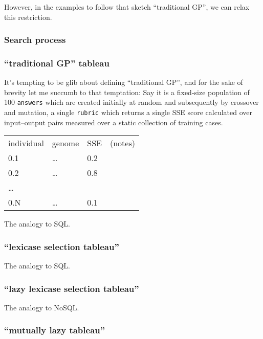 However, in the examples to follow that sketch ``traditional GP'', we can relax this restriction.

\subsubsection{Search process}\hypertarget{search-process}{}\label{search-process}

\subsubsection{``traditional GP'' tableau}\hypertarget{traditional-gp-tableau}{}\label{traditional-gp-tableau}

It's tempting to be glib about defining ``traditional GP'', and for the sake of brevity let me succumb to that temptation: Say it is a fixed-size population of 100 {\tt answers} which are created initially at random and subsequently by crossover and mutation, a single {\tt rubric} which returns a single SSE score calculated over input--output pairs measured over a static collection of training cases.

\begin{longtable}{|l|l|l|l|}
\hline
individual & genome & SSE & (notes)\\
0.1 & \ldots{} & 0.2 & \\
0.2 & \ldots{} & 0.8 & \\
\ldots{} &  &  & \\
0.N & \ldots{} & 0.1 & \\
\hline
\end{longtable}

The analogy to SQL.

\subsubsection{``lexicase selection tableau''}\hypertarget{lexicase-selection-tableau}{}\label{lexicase-selection-tableau}

The analogy to SQL.

\subsubsection{``lazy lexicase selection tableau''}\hypertarget{lazy-lexicase-selection-tableau}{}\label{lazy-lexicase-selection-tableau}

The analogy to NoSQL.

\subsubsection{``mutually lazy tableau''}\hypertarget{mutually-lazy-tableau}{}\label{mutually-lazy-tableau}

